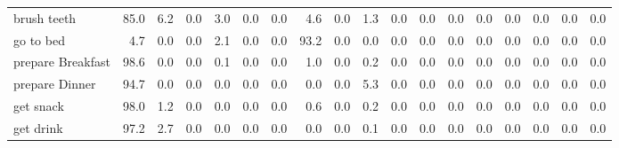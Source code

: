 \documentclass{article}
\begin{document}
\begin{sideways}
\begin{tabular}{lrrrrrrrrrrrrrrrrr}
brush teeth                   &        85.0 &                6.2 &           0.0 &               3.0 &                0.0 &                0.0 &              4.6 &                      0.0 &                   1.3 &              0.0 &              0.0 &                            0.0 &                      0.0 &                    0.0 &                                  0.0 &                          0.0 &                  0.0 \\
go to bed                     &         4.7 &                0.0 &           0.0 &               2.1 &                0.0 &                0.0 &             93.2 &                      0.0 &                   0.0 &              0.0 &              0.0 &                            0.0 &                      0.0 &                    0.0 &                                  0.0 &                          0.0 &                  0.0 \\
prepare Breakfast             &        98.6 &                0.0 &           0.0 &               0.1 &                0.0 &                0.0 &              1.0 &                      0.0 &                   0.2 &              0.0 &              0.0 &                            0.0 &                      0.0 &                    0.0 &                                  0.0 &                          0.0 &                  0.0 \\
prepare Dinner                &        94.7 &                0.0 &           0.0 &               0.0 &                0.0 &                0.0 &              0.0 &                      0.0 &                   5.3 &              0.0 &              0.0 &                            0.0 &                      0.0 &                    0.0 &                                  0.0 &                          0.0 &                  0.0 \\
get snack                     &        98.0 &                1.2 &           0.0 &               0.0 &                0.0 &                0.0 &              0.6 &                      0.0 &                   0.2 &              0.0 &              0.0 &                            0.0 &                      0.0 &                    0.0 &                                  0.0 &                          0.0 &                  0.0 \\
get drink                     &        97.2 &                2.7 &           0.0 &               0.0 &                0.0 &                0.0 &              0.0 &                      0.0 &                   0.1 &              0.0 &              0.0 &                            0.0 &                      0.0 &                    0.0 &                                  0.0 &                          0.0 &                  0.0 \\

\end{tabular}
\end{sideways}
\end{document}
